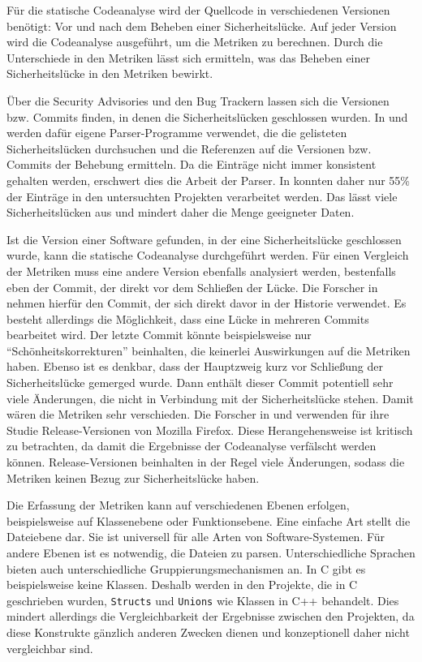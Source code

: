 Für die statische Codeanalyse wird der Quellcode in verschiedenen Versionen benötigt: Vor und nach dem Beheben einer Sicherheitslücke.
Auf jeder Version wird die Codeanalyse ausgeführt, um die Metriken zu berechnen.
Durch die Unterschiede in den Metriken lässt sich ermitteln, was das Beheben einer Sicherheitslücke in den Metriken bewirkt.

Über die Security Advisories und den Bug Trackern lassen sich die Versionen bzw. Commits finden, in denen die Sicherheitslücken geschlossen wurden.
In \cite{alves_et_al} und \cite{chowdhury_zulkernine_2009} werden dafür eigene Parser-Programme verwendet, die die gelisteten Sicherheitslücken durchsuchen und die Referenzen auf die Versionen bzw. Commits der Behebung ermitteln.
Da die Einträge nicht immer konsistent gehalten werden, erschwert dies die Arbeit der Parser.
In \cite{alves_et_al} konnten daher nur 55\% der Einträge in den untersuchten Projekten verarbeitet werden.
Das lässt viele Sicherheitslücken aus und mindert daher die Menge geeigneter Daten.

Ist die Version einer Software gefunden, in der eine Sicherheitslücke geschlossen wurde, kann die statische Codeanalyse durchgeführt werden.
Für einen Vergleich der Metriken muss eine andere Version ebenfalls analysiert werden, bestenfalls eben der Commit, der direkt vor dem Schließen der Lücke.
Die Forscher in \cite{alves_et_al} nehmen hierfür den Commit, der sich direkt davor in der Historie verwendet.
Es besteht allerdings die Möglichkeit, dass eine Lücke in mehreren Commits bearbeitet wird.
Der letzte Commit könnte beispielsweise nur "`Schönheitskorrekturen"' beinhalten, die keinerlei Auswirkungen auf die Metriken haben.
Ebenso ist es denkbar, dass der Hauptzweig kurz vor Schließung der Sicherheitslücke gemerged wurde.
Dann enthält dieser Commit potentiell sehr viele Änderungen, die nicht in Verbindung mit der Sicherheitslücke stehen.
Damit wären die Metriken sehr verschieden.
Die Forscher in \cite{chowdhury_zulkernine_2009} und \cite{chowdhury_zulkernine_2010} verwenden für ihre Studie Release-Versionen von Mozilla Firefox.
Diese Herangehensweise ist kritisch zu betrachten, da damit die Ergebnisse der Codeanalyse verfälscht werden können.
Release-Versionen beinhalten in der Regel viele Änderungen, sodass die Metriken keinen Bezug zur Sicherheitslücke haben.

Die Erfassung der Metriken kann auf verschiedenen Ebenen erfolgen, beispielsweise auf Klassenebene oder Funktionsebene.
Eine einfache Art stellt die Dateiebene dar.
Sie ist universell für alle Arten von Software-Systemen.
Für andere Ebenen ist es notwendig, die Dateien zu parsen.
Unterschiedliche Sprachen bieten auch unterschiedliche Gruppierungsmechanismen an.
In C gibt es beispielsweise keine Klassen.
Deshalb werden in \cite{alves_et_al} den Projekte, die in C geschrieben wurden, \texttt{Structs} und \texttt{Unions} wie Klassen in C++ behandelt.
Dies mindert allerdings die Vergleichbarkeit der Ergebnisse zwischen den Projekten, da diese Konstrukte gänzlich anderen Zwecken dienen und konzeptionell daher nicht vergleichbar sind.
